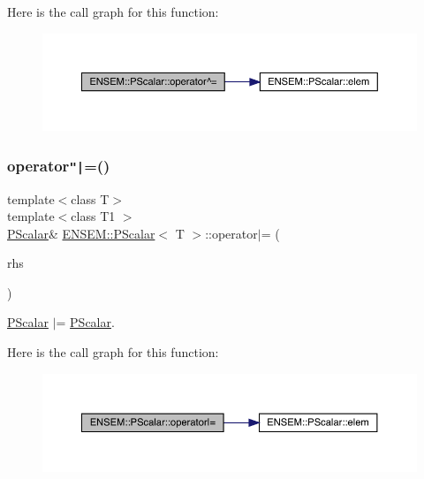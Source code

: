 Here is the call graph for this function\+:
\nopagebreak
\begin{figure}[H]
\begin{center}
\leavevmode
\includegraphics[width=350pt]{d3/d27/classENSEM_1_1PScalar_a3f256371cc925f01209559addfcbb632_cgraph}
\end{center}
\end{figure}
\mbox{\label{classENSEM_1_1PScalar_a59ee3adbb8dabcfb25aae9f9390dcef0}} 
\subsubsection{\texorpdfstring{operator\texttt{"|}=()}{operator|=()}\hspace{0.1cm}{\footnotesize\ttfamily [1/2]}}
{\footnotesize\ttfamily template$<$class T$>$ \\
template$<$class T1 $>$ \\
\mbox{\hyperlink{classENSEM_1_1PScalar}{P\+Scalar}}\& \mbox{\hyperlink{classENSEM_1_1PScalar}{E\+N\+S\+E\+M\+::\+P\+Scalar}}$<$ T $>$\+::operator$\vert$= (\begin{DoxyParamCaption}\item[{const \mbox{\hyperlink{classENSEM_1_1PScalar}{P\+Scalar}}$<$ T1 $>$ \&}]{rhs }\end{DoxyParamCaption})\hspace{0.3cm}{\ttfamily [inline]}}



\mbox{\hyperlink{classENSEM_1_1PScalar}{P\+Scalar}} $\vert$= \mbox{\hyperlink{classENSEM_1_1PScalar}{P\+Scalar}}. 

Here is the call graph for this function\+:
\nopagebreak
\begin{figure}[H]
\begin{center}
\leavevmode
\includegraphics[width=350pt]{d3/d27/classENSEM_1_1PScalar_a59ee3adbb8dabcfb25aae9f9390dcef0_cgraph}
\end{center}
\end{figure}
\mbox{\label{classENSEM_1_1PScalar_a59ee3adbb8dabcfb25aae9f9390dcef0}} 

